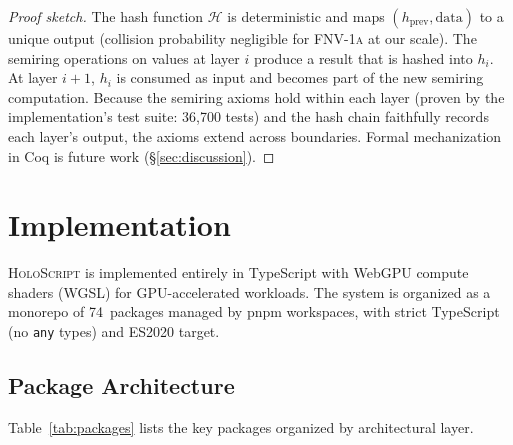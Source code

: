 \documentclass[sigchi-a]{acmart}
\newcommand{\holoscript}{\textsc{HoloScript}}
\newcommand{\fnvhash}{\textsc{FNV-1a}}
\newcommand{\hashfn}{\mathcal{H}}
\begin{document}
\begin{proof}[Proof sketch]
The hash function $\hashfn$ is deterministic and maps $(h_{\text{prev}},
\text{data})$ to a unique output (collision probability negligible for
\fnvhash{} at our scale). The semiring operations on values at layer $i$
produce a result that is hashed into $h_i$. At layer $i{+}1$, $h_i$ is
consumed as input and becomes part of the new semiring computation.
Because the semiring axioms hold within each layer (proven by the
implementation's test suite: 36,700 tests) and the hash chain faithfully
records each layer's output, the axioms extend across boundaries.
Formal mechanization in Coq is future work (\S\ref{sec:discussion}).
\end{proof}


\section{Implementation}
\label{sec:implementation}

\holoscript{} is implemented entirely in TypeScript with WebGPU compute
shaders (WGSL) for GPU-accelerated workloads. The system is organized as a
monorepo of 74~packages managed by pnpm workspaces, with strict TypeScript
(no \texttt{any} types) and ES2020 target.

\subsection{Package Architecture}

Table~\ref{tab:packages} lists the key packages organized by architectural
layer.
\end{document}
